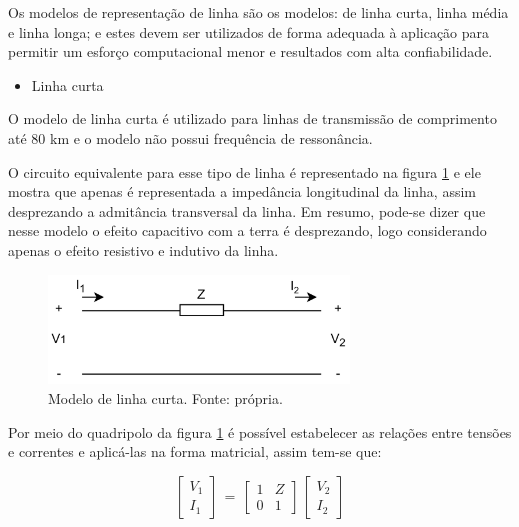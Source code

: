 Os modelos de representação de linha são os modelos: de linha curta, linha média e linha longa; e estes devem ser utilizados de forma adequada à aplicação para permitir um esforço computacional menor e resultados com alta confiabilidade.

\begin{itemize}
    \item Linha curta
\end{itemize}

O modelo de linha curta é utilizado para linhas de transmissão de comprimento até 80 km e o modelo não possui frequência de ressonância. 

O circuito equivalente para esse tipo de linha é representado na figura \ref{top2:fig:2} e ele mostra que apenas é representada a impedância longitudinal da linha, assim desprezando a admitância transversal da linha. Em resumo, pode-se dizer que nesse modelo o efeito capacitivo com a terra é desprezando, logo considerando apenas o efeito resistivo e indutivo da linha. 

\begin{figure}[H]
\begin{center}
\includegraphics[width=8cm]{images/linha_curta.jpg}
\caption{Modelo de linha curta. Fonte: própria.}
\label{top2:fig:2} 
\end{center}
\end{figure}

Por meio do quadripolo da figura \ref{top2:fig:2} é possível estabelecer as relações entre tensões e correntes e aplicá-las na forma matricial, assim tem-se que:

\begin{equation} \label{top2:eq:3}
    \begin{bmatrix} V_1 \\ I_1  \end{bmatrix} \,=\, \begin{bmatrix} 1 & Z \\0 & 1  \end{bmatrix}\, \begin{bmatrix} V_2 \\ I_2  \end{bmatrix}
\end{equation}

